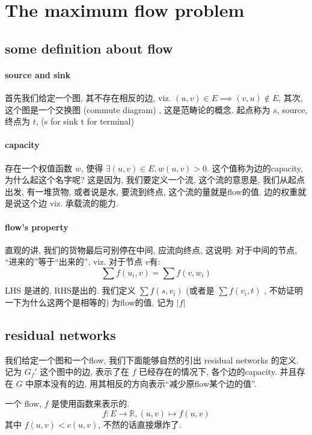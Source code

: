 \documentclass[a4paper, 10pt]{ctexart} %
\begin{document}
\section{The maximum flow problem}
\subsection{some definition about flow}
\paragraph{source and sink} %
首先我们给定一个图, 其不存在相反的边, viz. $ \left(u ,v\right) \in E \implies \left( v, u\right) \notin E $, 
其次, 这个图是一个交换图 (commute diagram) , 这是范畴论的概念. 起点称为 $ s $, source, 终点为 $ t $,  (s for sink t for terminal) 

\paragraph{capacity} %
存在一个权值函数 $ w $, 
使得 $ \exists \left( u ,v\right) \in E, w \left( u  , v\right) > 0 $. 这个值称为边的capacity, 
为什么起这个名字呢? 这是因为, 我们要定义一个流, 这个流的意思是, 我们从起点出发, 有一堆货物, 或者说是水, 要流到终点, 
这个流的量就是flow的值. 边的权重就是说这个边 viz. 承载流的能力. 

\paragraph{flow's property} %
直观的讲, 我们的货物最后可别停在中间, 应流向终点, 这说明: 对于中间的节点, ``进来的''等于``出来的'', viz. 对于节点 $ v $有: 
$$ 
\sum_{}  f\left(u_{i} , v\right) = \sum_{} f \left(v , w _{i}\right) 
$$
LHS 是进的, RHS是出的. 
我们定义 $ \sum f(s , v_i) $ (或者是 $ \sum f( v_i , t) $ , 不妨证明一下为什么这两个是相等的) 为flow的值, 记为
$|f|$

\subsection{residual networks}
我们给定一个图和一个flow, 我们下面能够自然的引出 residual networks 的定义. 记为 $ G_f' $ 这个图中的边, 表示了在 $ f $ 已经存在的情况下, 各个边的capacity. 并且存在 $ G $ 中原本没有的边, 用其相反的方向表示``减少原flow某个边的值''.

一个 flow, $f$ 是使用函数来表示的.
$$ f : E \to \mathbb R , (u,v ) \mapsto f (u,v) $$
其中 $ f(u ,v ) < c (u, v) $, 不然的话直接爆炸了.
\end{document}
